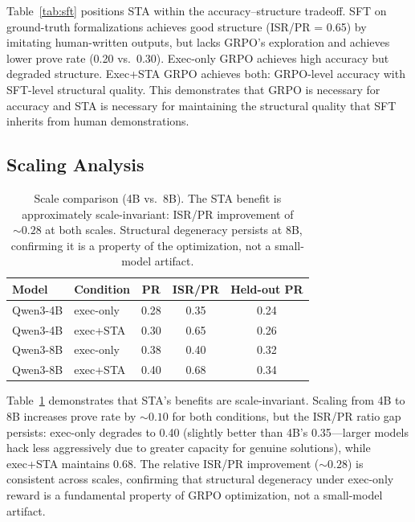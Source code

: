 \documentclass[11pt,a4paper]{article}
\begin{document}
Table~\ref{tab:sft} positions STA within the accuracy--structure tradeoff. SFT on ground-truth formalizations achieves good structure (ISR/PR = 0.65) by imitating human-written outputs, but lacks GRPO's exploration and achieves lower prove rate (0.20 vs.\ 0.30). Exec-only GRPO achieves high accuracy but degraded structure. Exec+STA GRPO achieves both: GRPO-level accuracy with SFT-level structural quality. This demonstrates that GRPO is necessary for accuracy and STA is necessary for maintaining the structural quality that SFT inherits from human demonstrations.

\subsection{Scaling Analysis}
\label{sec:scaling}

\begin{table}[t]
\centering
\small
\begin{tabular}{llccc}
\toprule
\textbf{Model} & \textbf{Condition} & \textbf{PR} & \textbf{ISR/PR} & \textbf{Held-out PR} \\
\midrule
Qwen3-4B & exec-only & 0.28 & 0.35 & 0.24 \\
Qwen3-4B & exec+STA & 0.30 & 0.65 & 0.26 \\
Qwen3-8B & exec-only & 0.38 & 0.40 & 0.32 \\
Qwen3-8B & exec+STA & 0.40 & 0.68 & 0.34 \\
\bottomrule
\end{tabular}
\caption{Scale comparison (4B vs.\ 8B). The STA benefit is approximately scale-invariant: ISR/PR improvement of ${\sim}0.28$ at both scales. Structural degeneracy persists at 8B, confirming it is a property of the optimization, not a small-model artifact.}
\label{tab:scaling}
\end{table}

Table~\ref{tab:scaling} demonstrates that STA's benefits are scale-invariant. Scaling from 4B to 8B increases prove rate by ${\sim}0.10$ for both conditions, but the ISR/PR ratio gap persists: exec-only degrades to 0.40 (slightly better than 4B's 0.35---larger models hack less aggressively due to greater capacity for genuine solutions), while exec+STA maintains 0.68. The relative ISR/PR improvement (${\sim}0.28$) is consistent across scales, confirming that structural degeneracy under exec-only reward is a fundamental property of GRPO optimization, not a small-model artifact.
\end{document}
